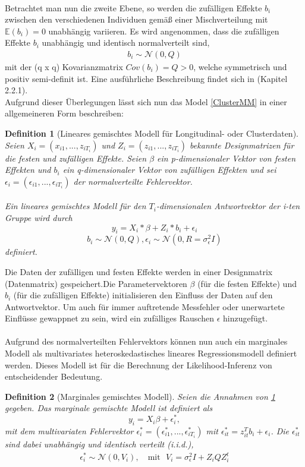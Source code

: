 \documentclass[%
thesis=student,%
coverpage=false,%
titlepage=false,%
headmarks=true, %
german,%
font=libertine, %
math=newpxtx, %
BCOR=5mm,%
coverBCOR=11mm%
]{tumbook}
\theoremstyle{break}
\newtheorem{definition}{Definition}[section]
\begin{document}
\\
Betrachtet man nun die zweite Ebene, so werden die zufälligen Effekte $b_i$ zwischen den verschiedenen Individuen gemäß einer Mischverteilung mit $ \mathbb{E}(b_i)=0$ unabhängig variieren. Es wird angenommen, dass die zufälligen Effekte $b_i$ unabhängig und identisch normalverteilt sind,
\begin{align}
	b_i \sim \mathcal{N}(0,Q)
\end{align}\noindent
mit der (q x q) Kovarianzmatrix $Cov(b_i) = Q > 0$, welche symmetrisch und positiv semi-definit ist. Eine ausführliche Beschreibung findet sich in \cite{pinheiro2000} (Kapitel 2.2.1).
\\
Aufgrund dieser Überlegungen lässt sich nun das Model \ref{ClusterMM} in einer allgemeineren Form beschreiben:
\begin{definition}[Lineares gemischtes Modell für Longitudinal- oder Clusterdaten] \label{LMM für longitudinale Daten}
	Seien $X_i = (x_{i1}, ..., z_{iT_i})$  und $Z_i = (z_{i1},...,z_{iT_i})$ bekannte Designmatrizen für die festen und zufälligen Effekte. Seien $\beta$ ein p-dimensionaler Vektor von festen Effekten und $b_i$ ein q-dimensionaler Vektor von zufälligen Effekten und sei $\epsilon_i = (\epsilon_{i1},...,\epsilon_{iT_i})$ der normalverteilte Fehlervektor.\\
	\\
	Ein lineares gemischtes Modell für den $T_i$-dimensionalen Antwortvektor der i-ten Gruppe wird durch 
	$$y_i = X_i * \beta + Z_i * b_i + \epsilon_i$$ 
	$$b_i \sim \mathcal{N}(0,Q), \epsilon_i \sim \mathcal{N}(0,R = \sigma^2_\epsilon I)$$
	definiert.
\end{definition}\noindent
Die Daten der zufälligen und festen Effekte werden in einer Designmatrix (Datenmatrix) gespeichert.Die Parametervektoren $\beta$ (für die festen Effekte) und $b_i$ (für die zufälligen Effekte) initialisieren den Einfluss der Daten auf den Antwortvektor. Um auch für immer auftretende Messfehler oder unerwartete Einflüsse gewappnet zu sein, wird ein zufälliges Rauschen $\epsilon$ hinzugefügt.\\
\\
Aufgrund des normalverteilten Fehlervektors können nun auch ein marginales Modell als multivariates heteroskedastisches lineares Regressionsmodell definiert werden. Dieses Modell ist für die Berechnung der Likelihood-Inferenz von entscheidender Bedeutung. 
\begin{definition}[Marginales gemischtes Modell]
	Seien die Annahmen von \ref{LMM für longitudinale Daten} gegeben. 
 	Das marginale gemischte Modell ist definiert als
 	$$ y_i = X_i\beta + \epsilon_i^*,$$
 	mit dem multivariaten Fehlervektor $\epsilon_i^* = (\epsilon_{i1}^*,...,\epsilon_{iT_i}^*) $ mit $\epsilon_{it}^* = z_{it}^Tb_i + \epsilon_i$. 
 	Die $\epsilon_{it}^*$ sind dabei unabhängig und identisch verteilt (i.i.d.),
 	\begin{align}
 		\epsilon_i^* \sim \mathcal{N}(0,V_i), \hspace{12pt}\text{mit} \hspace{8pt}V_i = \sigma_\epsilon^2I + Z_i Q Z_i^t 
 	\end{align}
\end{definition} \noindent
\end{document}
